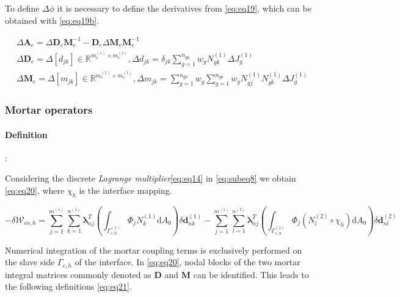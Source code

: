 \documentclass[a4paper,10pt]{article} %
\begin{document}
To define $\Delta \phi$ it is necessary to define the derivatives from \eqref{eq:eq19}, which can be obtained with \eqref{eq:eq19b}.

\begin{equation}\label{eq:eq19b}
\begin{aligned}
 & \Delta \mathbf{A}_e = \Delta \mathbf{D}_e\mathbf{M}_e^{-1} - \mathbf{D}_e\Delta\mathbf{M}_e\mathbf{M}_e^{-1} \\
 &\Delta \mathbf{D}_e = \Delta[d_{jk}] \in \mathbb{R}^{m_e^{(1)} \times m_e^{(1)}}, \Delta d_{jk} = \delta_{jk} \sum_{g = 1}^{n_{gp}} w_g N_{gk}^{(1)} \Delta J_g^{(1)}  \\
 & \Delta \mathbf{M}_e = \Delta[m_{jk}] \in \mathbb{R}^{m_e^{(1)} \times m_e^{(1)}}, \Delta m_{jk} = \sum_{g = 1}^{n_{gp}} w_g  \sum_{g = 1}^{n_{gp}} w_g  N_{gj}^{(1)} N_{gk}^{(1)} \Delta J_g^{(1)}
\end{aligned}
 \end{equation}
 
\subsubsection{Mortar operators}

\paragraph{Definition}:

Considering the discrete \textit{Lagrange multiplier}\eqref{eq:eq14} in \eqref{eq:subeq8} we obtain \eqref{eq:eq20}, where $\chi_h$ is the interface mapping.

\begin{equation}\label{eq:eq20}
 -\delta \mathcal{W}_{co,h} = \sum_{j=1}^{m^{(1)}}\sum_{k=1}^{n^{(1)}} \boldsymbol{\lambda}_{nj}^T \left(\int_{\Gamma_{c,h}^{(1)}} \Phi_j N_k^{(1)} \text{d}A_0 \right) \delta \mathbf{d}_{nk}^{(1)} -\sum_{j=1}^{m^{(1)}}\sum_{l=1}^{n^{(2)}} \boldsymbol{\lambda}_{nj}^T \left(\int_{\Gamma_{c,h}^{(1)}} \Phi_j \left(N_l^{(2)} \circ \chi_h\right) \text{d}A_0 \right) \delta \mathbf{d}_{nl}^{(2)}
\end{equation}

Numerical integration of the mortar coupling terms is exclusively performed on the slave side $\Gamma_{c,h}$ of the interface. In \eqref{eq:eq20}, nodal blocks of the two mortar integral matrices commonly denoted as $\mathbf{D}$ and $\mathbf{M}$ can be identified. This leads to the following definitions \eqref{eq:eq21}.
\end{document}
